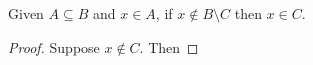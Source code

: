 
\begin{theorem}
  Given $A \subseteq B$ and $x \in A$, if $x \notin B\setminus C$ then $x
  \in C$. 
\end{theorem}

\begin{proof}
  Suppose $x \notin C$. Then
\end{proof}



\begin{align*}
\end{align*}
